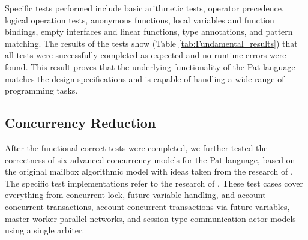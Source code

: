 \documentclass{l4proj}
\begin{document}
Specific tests performed include basic arithmetic tests, operator precedence, logical operation tests, anonymous functions, local variables and function bindings, empty interfaces and linear functions, type annotations, and pattern matching. The results of the tests show (Table \ref{tab:Fundamental_results}) that all tests were successfully completed as expected and no runtime errors were found. This result proves that the underlying functionality of the Pat language matches the design specifications and is capable of handling a wide range of programming tasks.

\begin{table}[ht]
\centering
\renewcommand{\arraystretch}{0.9}
\caption{Functional Correct Test Results}
\label{tab:Fundamental_results}
\end{table}

\subsection{Concurrency Reduction}
After the functional correct tests were completed, we further tested the correctness of six advanced concurrency models for the Pat language, based on the original mailbox algorithmic model with ideas taken from the research of \cite{deaposliguoro_2018_mailbox}. The specific test implementations refer to the research of \cite{fowler_2023_special}. These test cases cover everything from concurrent lock, future variable handling, and account concurrent transactions, account concurrent transactions via future variables, master-worker parallel networks, and session-type communication actor models using a single arbiter.
\end{document}
